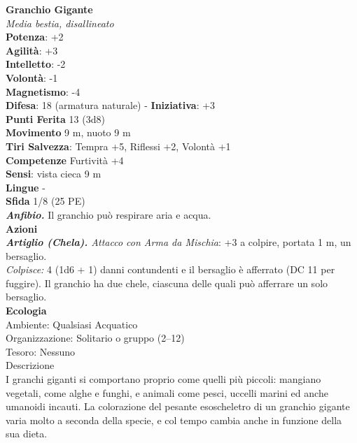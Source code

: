 \begin{multicols}{2}
\medskip\textbf{Granchio Gigante}\\
\emph{Media bestia, disallineato}\\
\textbf{Potenza}: +2\\
\textbf{Agilità}: +3\\
\textbf{Intelletto}: -2\\
\textbf{Volontà}: -1\\
\textbf{Magnetismo}: -4\\
\textbf{Difesa}: 18 (armatura naturale) - \textbf{Iniziativa}: +3\\
\textbf{Punti Ferita} 13 (3d8)\\
\textbf{Movimento} 9 m, nuoto 9 m\\
\textbf{Tiri Salvezza}: Tempra +5, Riflessi +2, Volontà +1 \\
\textbf{Competenze} Furtività +4\\
\textbf{Sensi}: vista cieca 9 m\\
\textbf{Lingue} -\\
\textbf{Sfida} 1/8 (25 PE)\smallskip\\
\emph{\textbf{Anfibio.}} Il granchio può respirare aria e acqua.\\
\smallskip\textbf{Azioni}\\
\emph{\textbf{Artiglio (Chela).} Attacco con Arma da Mischia}: +3 a colpire, portata 1 m,  un bersaglio.\\
\emph{Colpisce:} 4 (1d6 + 1) danni contundenti e il bersaglio è afferrato (DC 11 per fuggire). Il granchio ha due chele, ciascuna delle quali può afferrare un solo bersaglio.\\
\textbf{Ecologia}\\
Ambiente: Qualsiasi Acquatico\\
Organizzazione: Solitario o gruppo (2–12)\\
Tesoro: Nessuno\\
Descrizione\\

I granchi giganti si comportano proprio come quelli più piccoli: mangiano vegetali, come alghe e funghi, e animali come pesci, uccelli marini ed anche umanoidi incauti. La colorazione del pesante esoscheletro di un granchio gigante varia molto a seconda della specie, e col tempo cambia anche in funzione della sua dieta. \\


\end{multicols}
